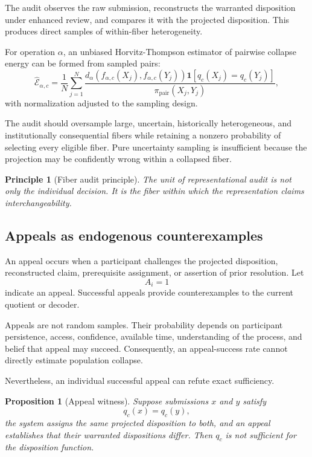 \documentclass[11pt]{article}
\newtheorem{proposition}[definition]{Proposition}
\newtheorem{principle}[definition]{Principle}
\theoremstyle{definition}
\newcommand{\ind}{\mathbf{1}}
\begin{document}
The audit observes the raw submission, reconstructs the warranted disposition under enhanced review, and compares it with the projected disposition. This produces direct samples of within-fiber heterogeneity.

For operation \(\alpha\), an unbiased Horvitz-Thompson estimator \cite{horvitz1952} of pairwise collapse energy can be formed from sampled pairs:
\[
\widehat{\mathcal E}_{\alpha,c}
=
\frac{1}{N}
\sum_{j=1}^{N}
\frac{
d_\alpha
\left(
f_{\alpha,c}(X_j),
f_{\alpha,c}(Y_j)
\right)
\ind[q_c(X_j)=q_c(Y_j)]
}{
\pi_{\mathrm{pair}}(X_j,Y_j)
},
\]
with normalization adjusted to the sampling design.

The audit should oversample large, uncertain, historically heterogeneous, and institutionally consequential fibers while retaining a nonzero probability of selecting every eligible fiber. Pure uncertainty sampling is insufficient because the projection may be confidently wrong within a collapsed fiber.

\begin{principle}[Fiber audit principle]
The unit of representational audit is not only the individual decision. It is the fiber within which the representation claims interchangeability.
\end{principle}

\subsection{Appeals as endogenous counterexamples}

An appeal occurs when a participant challenges the projected disposition, reconstructed claim, prerequisite assignment, or assertion of prior resolution. Let
\[
A_i=1
\]
indicate an appeal. Successful appeals provide counterexamples to the current quotient or decoder.

Appeals are not random samples. Their probability depends on participant persistence, access, confidence, available time, understanding of the process, and belief that appeal may succeed. Consequently, an appeal-success rate cannot directly estimate population collapse.

Nevertheless, an individual successful appeal can refute exact sufficiency.

\begin{proposition}[Appeal witness]
Suppose submissions \(x\) and \(y\) satisfy
\[
q_c(x)=q_c(y),
\]
the system assigns the same projected disposition to both, and an appeal establishes that their warranted dispositions differ. Then \(q_c\) is not sufficient for the disposition function.
\end{proposition}
\end{document}
